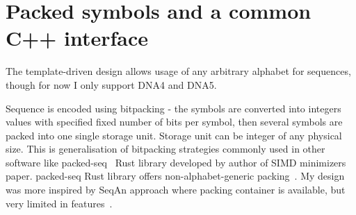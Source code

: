 \endgroup

\section{Packed symbols and a common C++ interface}
\label{sec:compact-sequence-range}
\label{sec:sequence-bit-layout}

The template-driven design allows usage of any arbitrary alphabet for sequences, though for now I only support DNA4 and DNA5.

Sequence is encoded using bitpacking - the symbols are converted into integers values with specified fixed number of bits per symbol, then several symbols are packed into one single storage unit. Storage unit can be integer of any physical size.
This is generalisation of bitpacking strategies commonly used in other software like packed-seq~\cite{packed_seq_library} Rust library developed by author of SIMD minimizers paper. packed-seq Rust library offers non-alphabet-generic packing~\cite{packed_seq_docs}.
My design was more inspired by SeqAn approach where packing container is available, but very limited in features~\cite{seqanManual}.

